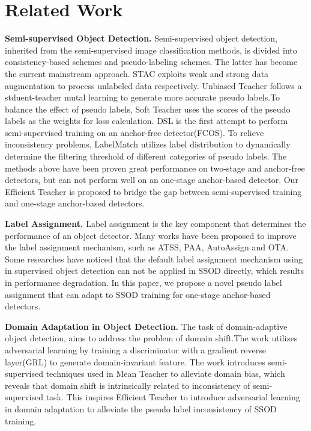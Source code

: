 \documentclass[10pt,twocolumn,letterpaper]{article}
\begin{document}
\section{Related Work}
\label{sec:related work}



\textbf{Semi-supervised Object Detection.} Semi-supervised object detection, inherited from the semi-supervised image classification methods\cite{xie2020self, sohn2020fixmatch, berthelot2019mixmatch, sajjadi2016regularization, tarvainen2017mean}, is divided into consistency-based schemes\cite{jeong2019consistency,tang2021proposal} and pseudo-labeling schemes\cite{liu2021unbiased,sohn2020simple, xu2021end,zhou2021instant}. The latter has become the current mainstream approach. STAC\cite{sohn2020simple} exploits weak and strong data augmentation to process unlabeled data respectively. Unbiased Teacher\cite{liu2021unbiased} follows a stduent-teacher mutal learning to generate more accurate pseudo labels.To balance the effect of pseudo labels, Soft Teacher\cite{xu2021end} uses the scores of the pseudo labels as the weights for loss calculation. DSL\cite{chen2022dense} is the first attempt to perform semi-supervised training on an anchor-free detector(FCOS)\cite{tian2019fcos}. To relieve inconsistency problems, LabelMatch\cite{chen2022label} utilizes label distribution to dynamically determine the filtering threshold of different categories of pseudo labels. The methods above have been proven great performance on two-stage and anchor-free detectors, but can not perform well on an one-stage anchor-based detector. Our Efficient Teacher is proposed to bridge the gap between semi-supervised training and one-stage anchor-based detectors.

\textbf{Label Assignment.} Label assignment is the key component that determines the performance of an object detector. Many works have been proposed to improve the label assignment mechanism, such as ATSS\cite{zhang2020bridging}, PAA\cite{kim2020probabilistic}, AutoAssign\cite{zhu2020autoassign} and OTA\cite{ge2021ota}. 
Some researches\cite{chen2022label}\cite{liu2022unbiased} have noticed that the default label assignment mechanism using in supervised object detection can not be applied in SSOD directly, which results in performance degradation. In this paper, we propose a novel pseudo label assignment that can adapt to SSOD training for one-stage anchor-based detectors.

\textbf{Domain Adaptation in Object Detection.} The task of domain-adaptive object detection\cite{deng2021unbiased,vs2021mega,chen2021self,li2021free}, aims to address the problem of domain shift\cite{chen2018domain}.The work\cite{ganin2015unsupervised} utilizes adversarial learning by training a discriminator with a gradient reverse layer(GRL) to generate domain-invariant feature. The work\cite{deng2021unbiased} introduces semi-supervised techniques used in Mean Teacher to alleviate domain bias, which reveals that domain shift is intrinsically related to inconsistency of semi-supervised task.
This inspires Efficient Teacher to introduce adversarial learning in domain adaptation to alleviate the pseudo label inconsistency of SSOD training.
\end{document}
